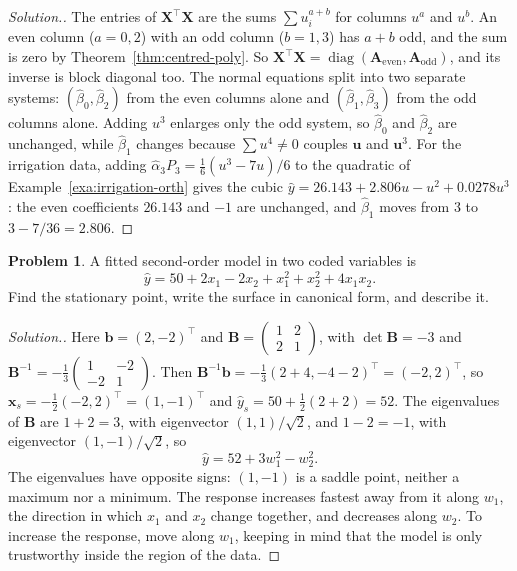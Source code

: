 \documentclass[11pt,a4paper]{article}
\numberwithin{equation}{section}
\theoremstyle{definition}
\newtheorem{problemx}{Problem}[subsection]
\newenvironment{problem}{\begin{problemx}}{\end{problemx}}
\newenvironment{solution}
  {\renewcommand{\qedsymbol}{}\begin{proof}[\textit{Solution}.]}
  {\end{proof}}
\begin{document}
\begin{solution}
The entries of $\mathbf{X}^\top\mathbf{X}$ are the sums $\sum u_i^{a + b}$ for columns $u^a$ and $u^b$. An even column ($a = 0, 2$) with an odd
column ($b = 1, 3$) has $a + b$ odd, and the sum is zero by Theorem~\ref{thm:centred-poly}. So
$\mathbf{X}^\top\mathbf{X} = \operatorname{diag}(\mathbf{A}_{\mathrm{even}}, \mathbf{A}_{\mathrm{odd}})$, and its inverse is block diagonal too. The normal equations
split into two separate systems: $(\hat\beta_0, \hat\beta_2)$ from the even columns alone and $(\hat\beta_1, \hat\beta_3)$ from the odd columns
alone. Adding $u^3$ enlarges only the odd system, so $\hat\beta_0$ and $\hat\beta_2$ are unchanged, while $\hat\beta_1$ changes because
$\sum u^4 \ne 0$ couples $\mathbf{u}$ and $\mathbf{u}^3$. For the irrigation data, adding $\hat\alpha_3P_3 = \frac16(u^3 - 7u)/6$ to the
quadratic of Example~\ref{exa:irrigation-orth} gives the cubic $\hat y = 26.143 + 2.806u - u^2 + 0.0278u^3$: the even
coefficients $26.143$ and $-1$ are unchanged, and $\hat\beta_1$ moves from $3$ to $3 - 7/36 = 2.806$.
\end{solution}

\begin{problem}\label{prob:saddle}
A fitted second-order model in two coded variables is
\[
\hat y = 50 + 2x_1 - 2x_2 + x_1^2 + x_2^2 + 4x_1x_2 .
\]
Find the stationary point, write the surface in canonical form, and describe it.
\end{problem}

\begin{solution}
Here $\mathbf{b} = (2, -2)^\top$ and $\mathbf{B} = \begin{pmatrix} 1 & 2 \\ 2 & 1 \end{pmatrix}$, with $\det\mathbf{B} = -3$ and
$\mathbf{B}^{-1} = -\frac13\begin{pmatrix} 1 & -2 \\ -2 & 1 \end{pmatrix}$. Then $\mathbf{B}^{-1}\mathbf{b} = -\frac13(2 + 4, -4 - 2)^\top = (-2, 2)^\top$, so
$\mathbf{x}_s = -\frac12(-2, 2)^\top = (1, -1)^\top$ and $\hat y_s = 50 + \frac12(2 + 2) = 52$. The eigenvalues of $\mathbf{B}$ are $1 + 2 = 3$, with
eigenvector $(1, 1)/\sqrt2$, and $1 - 2 = -1$, with eigenvector $(1, -1)/\sqrt2$, so
\[
\hat y = 52 + 3w_1^2 - w_2^2 .
\]
The eigenvalues have opposite signs: $(1, -1)$ is a saddle point, neither a maximum nor a minimum. The
response increases fastest away from it along $w_1$, the direction in which $x_1$ and $x_2$ change together, and
decreases along $w_2$. To increase the response, move along $w_1$, keeping in mind that the model is only
trustworthy inside the region of the data.
\end{solution}
\end{document}
